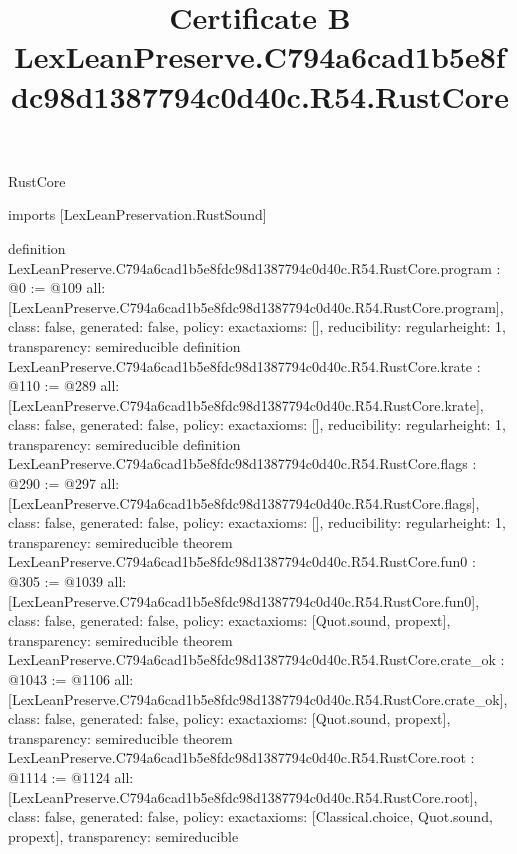 \begin{lexlean}{RustCore}
\title{Certificate B LexLeanPreserve.C794a6cad1b5e8fdc98d1387794c0d40c.R54.RustCore}
\begin{coremodule}
imports [LexLeanPreservation.RustSound]

definition LexLeanPreserve.C794a6cad1b5e8fdc98d1387794c0d40c.R54.RustCore.program : @0 := @109 {
  all: [LexLeanPreserve.C794a6cad1b5e8fdc98d1387794c0d40c.R54.RustCore.program],
  class: false,
  generated: false,
  policy: exact{axioms: []},
  reducibility: regular{height: 1},
  transparency: semireducible
}
definition LexLeanPreserve.C794a6cad1b5e8fdc98d1387794c0d40c.R54.RustCore.krate : @110 := @289 {
  all: [LexLeanPreserve.C794a6cad1b5e8fdc98d1387794c0d40c.R54.RustCore.krate],
  class: false,
  generated: false,
  policy: exact{axioms: []},
  reducibility: regular{height: 1},
  transparency: semireducible
}
definition LexLeanPreserve.C794a6cad1b5e8fdc98d1387794c0d40c.R54.RustCore.flags : @290 := @297 {
  all: [LexLeanPreserve.C794a6cad1b5e8fdc98d1387794c0d40c.R54.RustCore.flags],
  class: false,
  generated: false,
  policy: exact{axioms: []},
  reducibility: regular{height: 1},
  transparency: semireducible
}
theorem LexLeanPreserve.C794a6cad1b5e8fdc98d1387794c0d40c.R54.RustCore.fun0 : @305 := @1039 {
  all: [LexLeanPreserve.C794a6cad1b5e8fdc98d1387794c0d40c.R54.RustCore.fun0],
  class: false,
  generated: false,
  policy: exact{axioms: [Quot.sound, propext]},
  transparency: semireducible
}
theorem LexLeanPreserve.C794a6cad1b5e8fdc98d1387794c0d40c.R54.RustCore.crate_ok : @1043 := @1106 {
  all: [LexLeanPreserve.C794a6cad1b5e8fdc98d1387794c0d40c.R54.RustCore.crate_ok],
  class: false,
  generated: false,
  policy: exact{axioms: [Quot.sound, propext]},
  transparency: semireducible
}
theorem LexLeanPreserve.C794a6cad1b5e8fdc98d1387794c0d40c.R54.RustCore.root : @1114 := @1124 {
  all: [LexLeanPreserve.C794a6cad1b5e8fdc98d1387794c0d40c.R54.RustCore.root],
  class: false,
  generated: false,
  policy: exact{axioms: [Classical.choice, Quot.sound, propext]},
  transparency: semireducible
}


\end{coremodule}
\end{lexlean}

